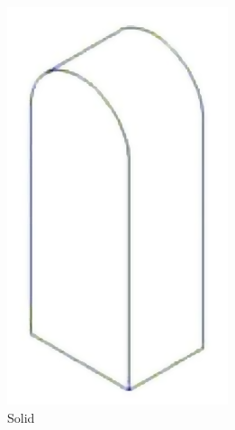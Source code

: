 \begin{description}
	\begin{figure}[H]
		\centering
		\begin{subfigure}[b]{0.2\textwidth}
			\centering
			\includegraphics[width=\textwidth]{images/spatial_decomposition_solid}
			\caption{Solid}
			\label{fig:spatial_decomposition_solid}
		\end{subfigure}
		\begin{subfigure}[b]{0.2\textwidth}
			\centering

\end{subfigure}
\end{figure}
\end{description}
